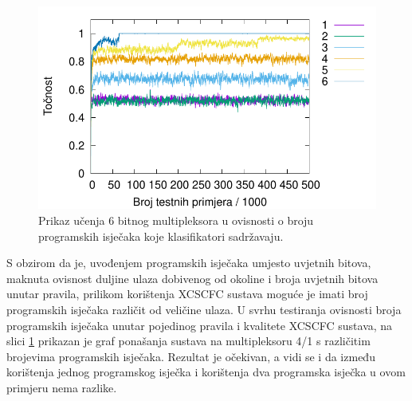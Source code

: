 \documentclass[times, utf8, zavrsni]{fer}
\begin{document}
\begin{figure}[!h]
    \centering
    \includegraphics[width=12cm]{img/mux_cond/6bitcond.pdf}
    \caption{Prikaz učenja 6 bitnog multipleksora u ovisnosti o broju programskih isječaka koje klasifikatori sadržavaju.}
    \label{img:6bitcond}
\end{figure}
S obzirom da je, uvođenjem programskih isječaka umjesto uvjetnih bitova, maknuta ovisnost duljine ulaza dobivenog od okoline i broja uvjetnih bitova unutar pravila, prilikom korištenja XCSCFC sustava moguće je imati broj programskih isječaka različit od veličine ulaza.
U svrhu testiranja ovisnosti broja programskih isječaka unutar pojedinog pravila i kvalitete XCSCFC sustava, na slici \ref{img:6bitcond} prikazan je graf ponašanja sustava na multipleksoru 4/1 s različitim brojevima programskih isječaka.
Rezultat je očekivan, a vidi se i da između korištenja jednog programskog isječka i korištenja dva programska isječka u ovom primjeru nema razlike.
\end{document}
